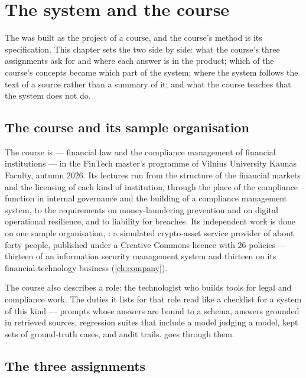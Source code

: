 \chapter{The system and the course}\label{ch:course}

The \product{} was built as the project of a course, and the course's method is its
specification. This chapter sets the two side by side: what the course's three assignments ask
for and where each answer is in the product; which of the course's concepts became which part
of the system; where the system follows the text of a source rather than a summary of it; and
what the course teaches that the system does not do.

\section{The course and its sample organisation}\label{sec:course:course}

The course is  --- financial
law and the compliance management of financial institutions --- in the FinTech master's
programme of Vilnius University Kaunas Faculty, autumn 2026. Its lectures run from the
structure of the financial markets and the licensing of each kind of institution, through the
place of the compliance function in internal governance and the building of a compliance
management system, to the requirements on money-laundering prevention and on digital
operational resilience, and to liability for breaches. Its independent work is done on one
sample organisation, \demo{}: a simulated crypto-asset service provider of about forty people,
published under a Creative Commons licence with 26 policies --- thirteen of an information
security management system and thirteen on its financial-technology business
(\cref{ch:company}).

The course also describes a role: the technologist who builds tools for legal and compliance
work. The duties it lists for that role read like a checklist for a system of this kind ---
prompts whose answers are bound to a schema, answers grounded in retrieved sources, regression
suites that include a model judging a model, kept sets of ground-truth cases, and audit
trails.  goes through them.

\section{The three assignments}\label{sec:course:assignments}

